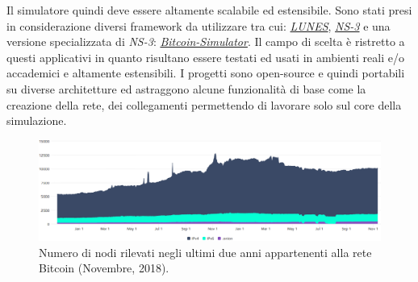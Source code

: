Il simulatore quindi deve essere altamente scalabile ed estensibile.\newline
Sono stati presi in considerazione diversi framework da utilizzare tra cui: \href{http://pads.cs.unibo.it/doku.php?id=pads:lunes}{\textit{LUNES}}, \href{https://www.nsnam.org/}{\textit{NS-3}} e una versione specializzata di \textit{NS-3}: \href{https://github.com/arthurgervais/Bitcoin-Simulator}{\textit{Bitcoin-Simulator}}. Il campo di scelta è ristretto a questi applicativi in quanto risultano essere testati ed usati in ambienti reali e/o accademici e altamente estensibili. I progetti sono open-source e quindi portabili su diverse architetture ed astraggono alcune funzionalità di base come la creazione della rete, dei collegamenti permettendo di lavorare solo sul core della simulazione.
\begin{figure}
    \includegraphics[width=\textwidth]{images/number_nodes.png}
    \caption{Numero di nodi rilevati negli ultimi due anni appartenenti alla rete Bitcoin (Novembre, 2018).}
\end{figure}

